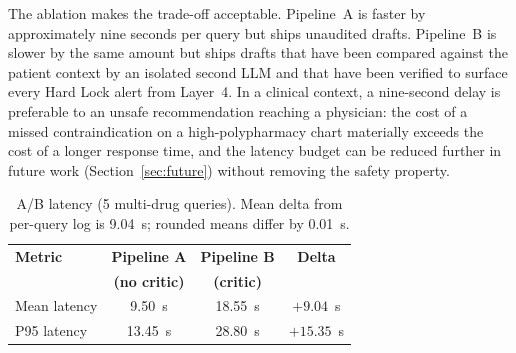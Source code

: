 \documentclass[twocolumn,10pt,main=USenglish]{asmeconf}
\begin{document}

The ablation makes
the trade-off acceptable. Pipeline~A is faster by approximately nine
seconds per query but ships unaudited drafts. Pipeline~B is slower
by the same amount but ships drafts that have been compared
against the patient context by an isolated second LLM and that
have been verified to surface every Hard Lock alert from Layer~4.
In a clinical context, a nine-second delay is preferable to an
unsafe recommendation reaching a physician: the cost of a missed
contraindication on a high-polypharmacy chart materially exceeds
the cost of a longer response time, and the latency budget can be
reduced further in future work
(Section~\ref{sec:future}) without removing the safety property.


\begin{table}[H]
\centering
\caption{A/B latency (5 multi-drug queries). Mean delta from per-query log is \num{9.04}~s; rounded means differ by \num{0.01}~s.}
\label{tab:ab}
\small
\begin{tabular}{@{}lccc@{}}
\toprule
\textbf{Metric} & \textbf{Pipeline A} & \textbf{Pipeline B} & \textbf{Delta}\\
                & \textbf{(no critic)} & \textbf{(critic)} & \\
\midrule
Mean latency & \num{9.50}~s  & \num{18.55}~s & $+\num{9.04}$~s \\
P95 latency  & \num{13.45}~s & \num{28.80}~s & $+\num{15.35}$~s \\
\bottomrule
\end{tabular}
\end{table}
\end{document}
